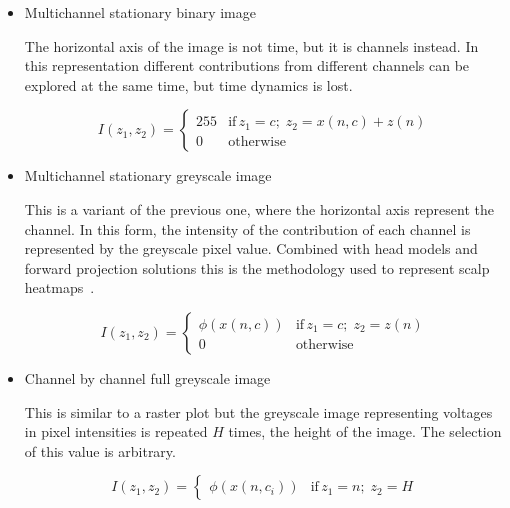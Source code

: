 \begin{itemize}
\item Multichannel stationary binary image

The horizontal axis of the image is not time, but it is channels instead.   In this representation different contributions from different channels can be explored at the same time, but time dynamics is lost.  

\begin{equation}
I(z_1,z_2) = \left\{ \begin{array}{rl}
255 & \text{if} \,  z_1 = c; \; z_2 =  x(n,c) + z(n) \\
0   & \mbox{otherwise}
\end{array}\right.
\label{eq:images}
\end{equation}

\item Multichannel stationary greyscale image

This is a variant of the previous one, where the horizontal axis represent the channel.   In this form, the intensity of the contribution of each channel is represented by the greyscale pixel value.  Combined with head models and forward projection solutions this is the methodology used to represent scalp heatmaps~\cite{Gramfort2013}.

\begin{equation}
I(z_1,z_2) = \left\{ \begin{array}{rl}
\phi(x(n,c)) & \text{if} \,  z_1 = c; \; z_2 =  z(n) \\
0   & \mbox{otherwise}
\end{array}\right.
\label{eq:images}
\end{equation}


\item Channel by channel full greyscale image

This is similar to a raster plot but the greyscale image representing voltages in pixel intensities is repeated $H$ times, the height of the image.  The selection of this value is arbitrary.

\begin{equation}
I(z_1,z_2) = \left\{ \begin{array}{rl} \phi(x(n,c_i))  & \text{if} \,  z_1 = n; \; z_2 = H \end{array}\right.
\label{eq:images}
\end{equation}


\end{itemize}

